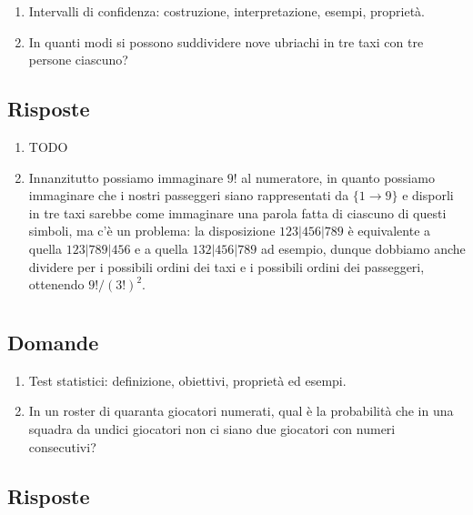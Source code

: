 \documentclass{article}
\begin{document}
\begin{enumerate}
    \item Intervalli di confidenza: costruzione, interpretazione, esempi, proprietà.
    \item In quanti modi si possono suddividere nove ubriachi in tre taxi con tre persone ciascuno?
\end{enumerate}

\subsection*{Risposte}

\begin{enumerate}
    \item TODO
    \item Innanzitutto possiamo immaginare $9!$ al numeratore, in quanto possiamo immaginare che i nostri passeggeri siano rappresentati da $\{1\to 9\}$ e disporli in tre taxi sarebbe come immaginare una parola fatta di ciascuno di questi simboli, ma c'è un problema: la disposizione $123|456|789$ è equivalente a quella $123|789|456$ e a quella $132|456|789$ ad esempio, dunque dobbiamo anche dividere per i possibili ordini dei taxi e i possibili ordini dei passeggeri, ottenendo $9!/(3!)^2$.
\end{enumerate}

\section{}%

\subsection*{Domande}

\begin{enumerate}
    \item Test statistici: definizione, obiettivi, proprietà ed esempi.
    \item In un roster di quaranta giocatori numerati, qual è la probabilità che in una squadra da undici giocatori non ci siano due giocatori con numeri consecutivi?
\end{enumerate}

\subsection*{Risposte}

\section{}%
\end{document}
